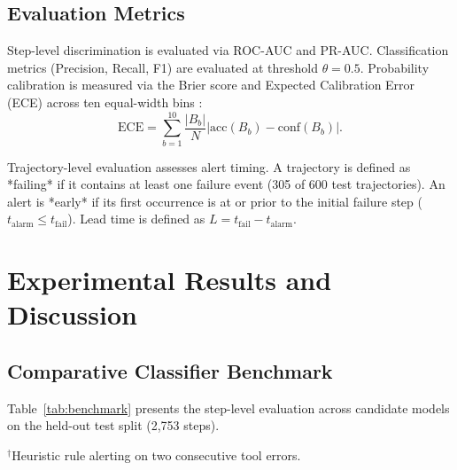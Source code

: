 \documentclass[journal,compsoc]{IEEEtran}
\begin{document}
\subsection{Evaluation Metrics}
Step-level discrimination is evaluated via ROC-AUC and PR-AUC. Classification metrics (Precision, Recall, F1) are evaluated at threshold $\theta = 0.5$. Probability calibration is measured via the Brier score \cite{brier1950verification} and Expected Calibration Error (ECE) across ten equal-width bins \cite{guo2017calibration}:
\begin{equation}
\text{ECE} = \sum_{b=1}^{10} \frac{|B_b|}{N} |\text{acc}(B_b) - \text{conf}(B_b)|.
\end{equation}

Trajectory-level evaluation assesses alert timing. A trajectory is defined as *failing* if it contains at least one failure event (305 of 600 test trajectories). An alert is *early* if its first occurrence is at or prior to the initial failure step ($t_{\text{alarm}} \le t_{\text{fail}}$). Lead time is defined as $L = t_{\text{fail}} - t_{\text{alarm}}$.

\section{Experimental Results and Discussion}

\subsection{Comparative Classifier Benchmark}
Table~\ref{tab:benchmark} presents the step-level evaluation across candidate models on the held-out test split (2,753 steps).

\begin{table}[h]
\centering
\caption{Test-Set Classifier Benchmark (2,753 Steps)}
\label{tab:benchmark}
\vspace{1mm}
\raggedright \footnotesize $^\dagger$Heuristic rule alerting on two consecutive tool errors.
\end{table}
\end{document}
